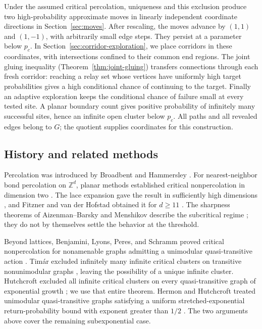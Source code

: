 \documentclass[11pt]{article}
\theoremstyle{definition}
\newcommand{\pc}{p_c}
\newcommand{\Z}{\mathbb Z}
\begin{document}
Under the assumed critical percolation, uniqueness and this exclusion
produce two high-probability approximate moves in linearly independent
coordinate directions in Section~\ref{sec:moves}. After rescaling, the moves advance by
$(1,1)$ and $(1,-1)$, with arbitrarily small edge steps.
They persist at a parameter below $\pc$. In
Section~\ref{sec:corridor-exploration}, we place corridors in
these coordinates, with intersections confined to their common
end regions. The joint gluing inequality
(Theorem~\ref{thm:joint-gluing}) transfers connections through each
fresh corridor: reaching a relay set whose vertices have uniformly
high target probabilities gives a high conditional chance of continuing
to the target. Finally an adaptive exploration keeps the
conditional chance of failure small at every tested site. A planar
boundary count gives positive probability of infinitely many
successful sites, hence an infinite open cluster below $\pc$.
All paths and all revealed edges belong to $G$; the quotient supplies
coordinates for this construction.


\subsection{History and related methods}

Percolation was introduced by Broadbent and Hammersley
\cite{BroadbentHammersley1957}. For nearest-neighbor bond percolation
on $\Z^d$, planar methods established critical nonpercolation in
dimension two \cite{Harris1960,Kesten1980}. The lace expansion gave
the result in sufficiently high dimensions \cite{HaraSlade1990},
and Fitzner and van der Hofstad obtained it for $d\ge11$
\cite{FitznerHofstad2017}. The sharpness theorems of Aizenman--Barsky
and Menshikov describe the subcritical regime
\cite{AizenmanBarsky1987,Menshikov1986}; they do not by themselves
settle the behavior at the threshold.

Beyond lattices, Benjamini, Lyons, Peres, and Schramm proved critical
nonpercolation for nonamenable graphs admitting a unimodular
quasi-transitive action \cite{BLPS1999Critical}. Tim\'ar excluded
infinitely many infinite critical clusters on transitive
nonunimodular graphs \cite{Timar2006Nonunimodular}, leaving the
possibility of a unique infinite cluster. Hutchcroft excluded all
infinite critical clusters on every quasi-transitive graph of
exponential growth \cite[Theorem~1.2]{Hutchcroft2016}; we use that
entire theorem. Hermon and Hutchcroft treated unimodular
quasi-transitive graphs satisfying a uniform stretched-exponential
return-probability bound with exponent greater than $1/2$
\cite[Theorem~1.2]{HermonHutchcroft2021}. The two arguments above
cover the remaining subexponential case.
\end{document}
